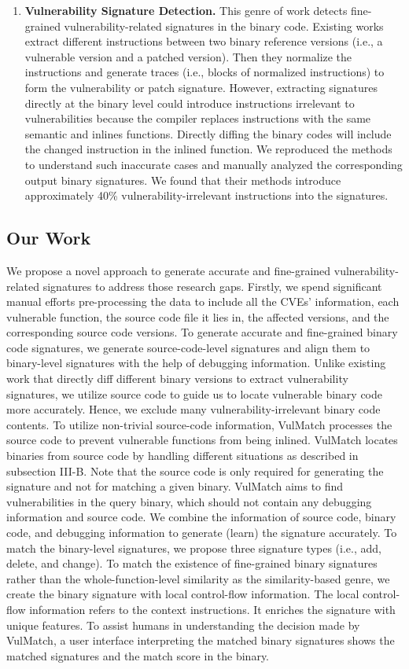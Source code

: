 \documentclass[lettersize,journal]{IEEEtran}
\begin{document}
\begin{enumerate}
\item \textbf{Vulnerability Signature Detection.} This genre of work detects fine-grained vulnerability-related signatures in the binary code. Existing works extract different
instructions between two binary reference versions (i.e.,
a vulnerable version and a patched version). Then they
normalize the instructions and generate traces (i.e., blocks
of normalized instructions) to form the vulnerability or
patch signature. However, extracting signatures directly at
the binary level could introduce instructions irrelevant to
vulnerabilities because the compiler replaces instructions
with the same semantic and inlines functions. Directly
diffing the binary codes will include the changed instruction in the inlined function. We reproduced the methods to understand such inaccurate cases and manually
analyzed the corresponding output binary signatures. We
found that their methods introduce approximately 40\%
vulnerability-irrelevant instructions into the signatures.
\end{enumerate}

\subsection{Our Work}
We propose a novel approach to generate accurate and
fine-grained vulnerability-related signatures to address those
research gaps. Firstly, we spend significant manual efforts
pre-processing the data to include all the CVEs’ information,
each vulnerable function, the source code file it lies in, the
affected versions, and the corresponding source code versions.
To generate accurate and fine-grained binary code signatures,
we generate source-code-level signatures and align them to
binary-level signatures with the help of debugging information.
Unlike existing work that directly diff different
binary versions to extract vulnerability signatures, we utilize
source code to guide us to locate vulnerable binary code more
accurately. Hence, we exclude many vulnerability-irrelevant
binary code contents. To utilize non-trivial source-code information, VulMatch processes the source code to prevent
vulnerable functions from being inlined. VulMatch locates
binaries from source code by handling different situations as
described in subsection III-B. Note that the source code is only
required for generating the signature and not for matching a
given binary. VulMatch aims to find vulnerabilities in the query
binary, which should not contain any debugging information
and source code. We combine the information of source code,
binary code, and debugging information to generate (learn) the
signature accurately. To match the binary-level signatures, we
propose three signature types (i.e., add, delete, and change).
To match the existence of fine-grained binary signatures rather
than the whole-function-level similarity as the similarity-based
genre, we create the binary signature with local control-flow
information. The local control-flow information refers to the
context instructions. It enriches the signature with unique
features. To assist humans in understanding the decision made
by VulMatch, a user interface interpreting the matched binary
signatures shows the matched signatures and the match score
in the binary.
\end{document}
